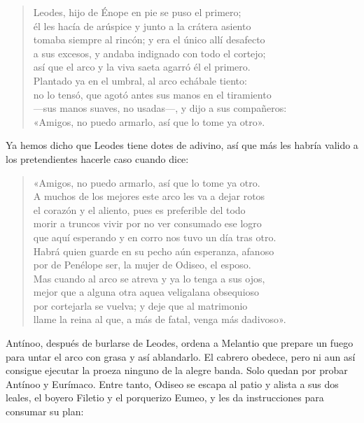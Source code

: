 \begin{verse}
Leodes, hijo de Énope en pie se puso el primero;\\
él les hacía de arúspice y junto a la crátera asiento\\
tomaba siempre al rincón; y era el único allí desafecto\\
a sus excesos, y andaba indignado con todo el cortejo;\\
así que el arco y la viva saeta agarró él el primero.\\
Plantado ya en el umbral, al arco echábale tiento:\\
no lo tensó, que agotó antes sus manos en el tiramiento\\
---sus manos suaves, no usadas---, y dijo a sus compañeros:\\
«Amigos, no puedo armarlo, así que lo tome ya otro».
\end{verse}

Ya hemos dicho que Leodes tiene dotes de adivino, así que más les habría valido a los pretendientes hacerle caso cuando dice:

\begin{verse}
«Amigos, no puedo armarlo, así que lo tome ya otro.\\
A muchos de los mejores este arco les va a dejar rotos\\
el corazón y el aliento, pues es preferible del todo\\
morir a truncos vivir por no ver consumado ese logro\\
que aquí esperando y en corro nos tuvo un día tras otro.\\
Habrá quien guarde en su pecho aún esperanza, afanoso\\
por de Penélope ser, la mujer de Odiseo, el esposo.\\
Mas cuando al arco se atreva y ya lo tenga a sus ojos,\\
mejor que a alguna otra aquea veligalana obsequioso\\
por cortejarla se vuelva; y deje que al matrimonio\\
llame la reina al que, a más de fatal, venga más dadivoso».
\end{verse}

Antínoo, después de burlarse de Leodes, ordena a Melantio que prepare un fuego para untar el arco con grasa y así ablandarlo. El cabrero obedece, pero ni aun así consigue ejecutar la proeza ninguno de la alegre banda. Solo quedan por probar Antínoo y Eurímaco. Entre tanto, Odiseo se escapa al patio y alista a sus dos leales, el boyero Filetio y el porquerizo Eumeo, y les da instrucciones para consumar su plan:

